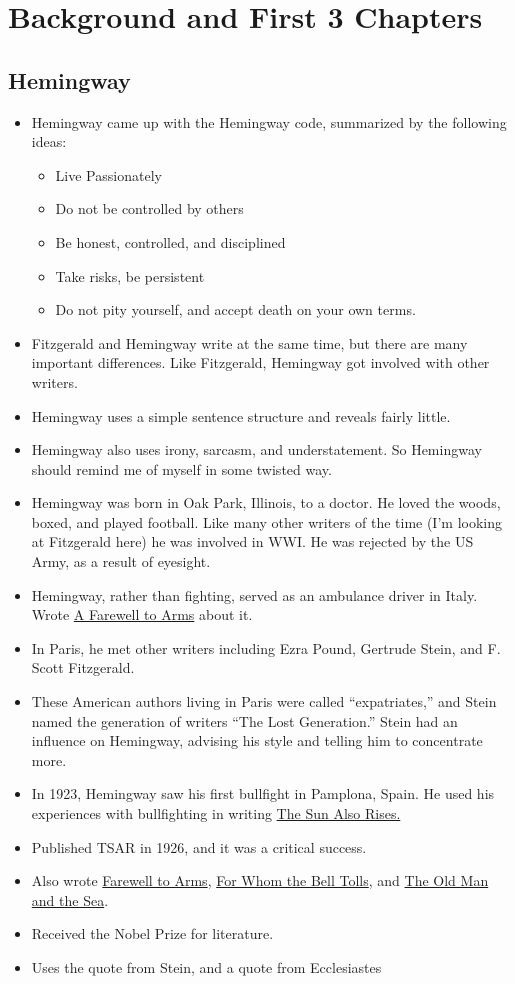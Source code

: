 \documentclass[11pt]{article}
\begin{document}
\section{Background and First 3 Chapters}
\subsection{Hemingway}
\begin{itemize}
	\item Hemingway came up with the Hemingway code, summarized by the following ideas:
		\begin{itemize}
			\item Live Passionately
			\item Do not be controlled by others
			\item Be honest, controlled, and disciplined
			\item Take risks, be persistent
			\item Do not pity yourself, and accept death on your own terms.
		\end{itemize}
	\item Fitzgerald and Hemingway write at the same time, but there are many 
		important differences.  Like Fitzgerald, Hemingway got involved with 
		other writers.
	\item Hemingway uses a simple sentence structure and reveals fairly little.
	\item Hemingway also uses irony, sarcasm, and understatement.  So 
		Hemingway should remind me of myself in some twisted way.
	\item Hemingway was born in Oak Park, Illinois, to a doctor.  He loved the 
		woods, boxed, and played football.  Like many other writers of the 
		time (I'm looking at Fitzgerald here) he was involved in WWI.  He was 
		rejected by the US Army, as a result of eyesight.
	\item Hemingway, rather than fighting, served as an ambulance driver in 
		Italy.  Wrote \underline{A Farewell to Arms} about it.  
	\item In Paris, he met other writers including Ezra Pound, Gertrude Stein, 
		and F. Scott Fitzgerald.
	\item These American authors living in Paris were called ``expatriates,'' 
		and Stein named the generation of writers ``The Lost Generation.'' 
		Stein had an influence on Hemingway, advising his style and telling 
		him to concentrate more.
	\item In 1923, Hemingway saw his first bullfight in Pamplona, Spain.  He 
		used his experiences with bullfighting in writing \underline{The Sun
		Also Rises.}
	\item Published TSAR in 1926, and it was a critical success.
	\item Also wrote \underline{Farewell to Arms}, \underline{For Whom the 
		Bell Tolls}, and \underline{The Old Man and the Sea}.
	\item Received the Nobel Prize for literature.
	\item Uses the quote from Stein, and a quote from Ecclesiastes
\end{itemize}
\end{document}
